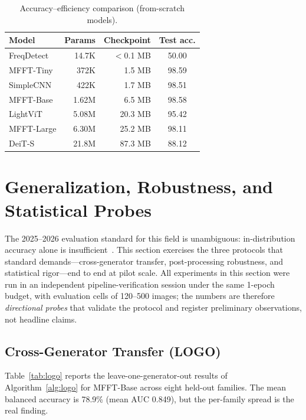 \documentclass[journal]{IEEEtran}
\begin{document}
\begin{table}[!t]
\renewcommand{\arraystretch}{1.2}
\caption{Accuracy--efficiency comparison (from-scratch models).}
\label{tab:efficiency}
\centering
\setlength{\tabcolsep}{4pt}
\begin{tabular}{lrrc}
\toprule
Model & Params & Checkpoint & Test acc. \\
\midrule
FreqDetect~\cite{frank2020} & 14.7K & $<$0.1 MB & 50.00 \\
MFFT-Tiny   & 372K   & 1.5 MB  & 98.59 \\
SimpleCNN   & 422K   & 1.7 MB  & 98.51 \\
MFFT-Base   & 1.62M  & 6.5 MB  & 98.58 \\
LightViT    & 5.08M  & 20.3 MB & 95.42 \\
MFFT-Large  & 6.30M  & 25.2 MB & 98.11 \\
DeiT-S~\cite{touvron2021} & 21.8M & 87.3 MB & 88.12 \\
\bottomrule
\end{tabular}
\end{table}

\section{Generalization, Robustness, and Statistical Probes}
\label{sec:probes}
The 2025--2026 evaluation standard for this field is unambiguous: in-distribution accuracy alone is insufficient~\cite{yan2025sanity,li2025aigibench}. This section exercises the three protocols that standard demands---cross-generator transfer, post-processing robustness, and statistical rigor---end to end at pilot scale. All experiments in this section were run in an independent pipeline-verification session under the same 1-epoch budget, with evaluation cells of 120--500 images; the numbers are therefore \emph{directional probes} that validate the protocol and register preliminary observations, not headline claims.

\subsection{Cross-Generator Transfer (LOGO)}
\label{sec:logo}
Table~\ref{tab:logo} reports the leave-one-generator-out results of Algorithm~\ref{alg:logo} for MFFT-Base across eight held-out families. The mean balanced accuracy is 78.9\% (mean AUC 0.849), but the per-family spread is the real finding.
\end{document}
